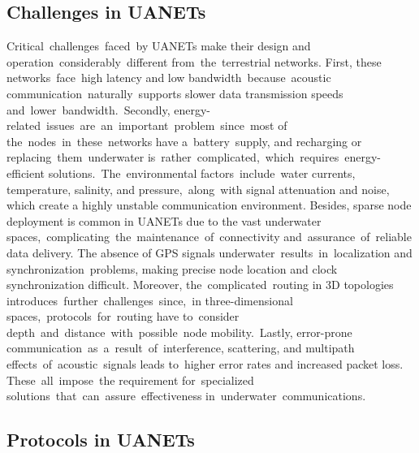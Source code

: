 \documentclass[]{nsm-thesis}
\begin{document}
\subsection{Challenges in UANETs}
Critical challenges faced by UANETs make their design and operation considerably different from the terrestrial networks. First, these networks face high latency and low bandwidth because acoustic communication naturally supports slower data transmission speeds and lower bandwidth. Secondly, energy-related issues are an important problem since most of the nodes in these networks have a battery supply, and recharging or replacing them underwater is rather complicated, which requires energy-efficient solutions. The environmental factors include water currents, temperature, salinity, and pressure, along with signal attenuation and noise, which create a highly unstable communication environment. Besides, sparse node deployment is common in UANETs due to the vast underwater spaces, complicating the maintenance of connectivity and assurance of reliable data delivery. The absence of GPS signals underwater results in localization and synchronization problems, making precise node location and clock synchronization difficult. Moreover, the complicated routing in 3D topologies introduces further challenges since, in three-dimensional spaces, protocols for routing have to consider depth and distance with possible node mobility. Lastly, error-prone communication as a result of interference, scattering, and multipath effects of acoustic signals leads to higher error rates and increased packet loss. These all impose the requirement for specialized solutions that can assure effectiveness in underwater communications.

\subsection{Protocols in UANETs}
\end{document}
